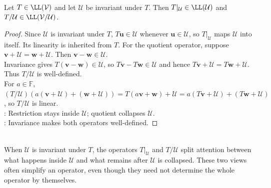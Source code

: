 \begin{proposition} \label{prop:restriction-and-quotient-operators-well-defined} \\
Let $T\in\LL(\mathcal{V})$ and let $\mathcal{U}$ be invariant under $T$. Then $T|_{\mathcal{U}}\in\LL(\mathcal{U})$ and $T/\mathcal{U}\in\LL(\mathcal{V}/\mathcal{U})$.
\begin{proof} Since $\mathcal{U}$ is invariant under $T$, $T\mathbf{u}\in\mathcal{U}$ whenever $\mathbf{u}\in\mathcal{U}$, so $T|_{\mathcal{U}}$ maps $\mathcal{U}$ into itself. Its linearity is inherited from $T$. For the quotient operator, suppose $\mathbf{v}+\mathcal{U}=\mathbf{w}+\mathcal{U}$. Then $\mathbf{v}-\mathbf{w}\in\mathcal{U}$.\\
Invariance gives $T(\mathbf{v}-\mathbf{w})\in\mathcal{U}$, so $T\mathbf{v}-T\mathbf{w}\in\mathcal{U}$ and hence $T\mathbf{v}+\mathcal{U}=T\mathbf{w}+\mathcal{U}$. Thus $T/\mathcal{U}$ is well-defined.\\
For $a\in\mathbb{F}$, $(T/\mathcal{U})(a(\mathbf{v}+\mathcal{U})+(\mathbf{w}+\mathcal{U})) =T(a\mathbf{v}+\mathbf{w})+\mathcal{U} =a(T\mathbf{v}+\mathcal{U})+(T\mathbf{w}+\mathcal{U})$, so $T/\mathcal{U}$ is linear.\\
: Restriction stays inside $\mathcal{U}$; quotient collapses $\mathcal{U}$.\\
: Invariance makes both operators well-defined.
\end{proof}
\end{proposition}

\begin{perspective} \label{per:restriction-quotient-perspective} \\
When $\mathcal{U}$ is invariant under $T$, the operators $T|_{\mathcal{U}}$ and $T/\mathcal{U}$ split attention between what happens inside $\mathcal{U}$ and what remains after $\mathcal{U}$ is collapsed. These two views often simplify an operator, even though they need not determine the whole operator by themselves.
\end{perspective}
